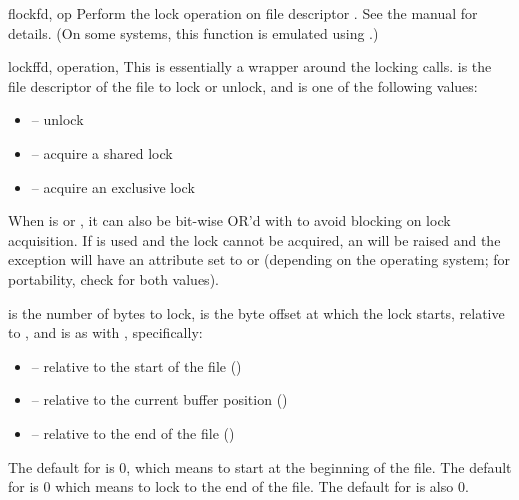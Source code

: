 \begin{funcdesc}{flock}{fd, op}
Perform the lock operation  on file descriptor .
See the \UNIX{} manual  for details.  (On some
systems, this function is emulated using .)
\end{funcdesc}

\begin{funcdesc}{lockf}{fd, operation,
    }
This is essentially a wrapper around the  locking
calls.   is the file descriptor of the file to lock or unlock,
and  is one of the following values:

\begin{itemize}
\item {} -- unlock
\item {} -- acquire a shared lock
\item {} -- acquire an exclusive lock
\end{itemize}

When  is  or , it
can also be bit-wise OR'd with  to avoid blocking on
lock acquisition.  If  is used and the lock cannot
be acquired, an  will be raised and the exception
will have an  attribute set to  or
 (depending on the operating system; for portability,
check for both values).

 is the number of bytes to lock,  is the byte
offset at which the lock starts, relative to , and
 is as with , specifically:

\begin{itemize}
\item {} -- relative to the start of the file
      ()
\item {} -- relative to the current buffer position
      ()
\item {} -- relative to the end of the file
      ()
\end{itemize}

The default for  is 0, which means to start at the
beginning of the file.  The default for  is 0 which means
to lock to the end of the file.  The default for  is also
0.

\end{funcdesc}

